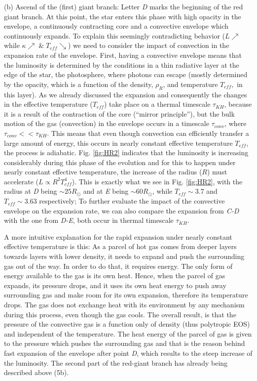 \documentclass{article}
\begin{document}
\begin{enumerate}
    (b) Ascend of the (first) giant branch: Letter {\it D} marks the beginning of the red giant branch. At this point, the star enters this phase with high opacity in the envelope, a continuously contracting core and a convective envelope which continuously expands. To explain this seemingly contradicting behavior ($L \nearrow$ while $\kappa \nearrow \; \&  \; T_{eff} \searrow$) we need to consider the impact of convection in the expansion rate of the envelope. First, having a convective envelope means that the luminosity is determined by the conditions in a thin radiative layer at the edge of the star, the photosphere, where photons can escape (mostly determined by the opacity, which is a function of the density, $\rho_R$, and temperature $T_{eff},$ in this layer).  As we already discussed the expansion and consequently the changes in the effective temperature ($T_{eff}$) take place on a thermal timescale $\tau_{KH}$, because it is a result of the contraction of the core (``mirror principle''), but the bulk motion of the gas (convection) in the envelope occurs in a timescale $\tau_{conv}$, where $\tau_{conv} << \tau_{KH}$. This means that even though convection can efficiently transfer a large amount of energy, this occurs in nearly constant effective temperature $T_{eff}$, the process is adiabatic. Fig. \ref{fig:HR2} indicates that the luminosity is increasing considerably during this phase of the evolution and for this to happen under nearly constant effective temperature, the increase of the radius ($R$) must accelerate ($L \propto R^2 T_{eff}^4$). This is exactly what we see in Fig. \ref{fig:HR2}, with the radius at {\it D} being $\sim 25 R_{\odot}$ and at {\it E} being $\sim 60 R_{\odot}$, while $T_{eff} \sim 3.7$ and $T_{eff} \sim 3.63$ respectively; To further evaluate the impact of the convective envelope on the expansion rate, we can also compare the expansion from {\it C-D} with the one from {\it D-E}, both occur in thermal timescale $\tau_{KH}$.

    A more intuitive explanation for the rapid expansion under nearly constant effective temperature is this: As a parcel of hot gas comes from deeper layers towards layers with lower density, it needs to expand and push the surrounding gas out of the way. In order to do that, it requires energy. The only form of energy available to the gas is its own heat. Hence, when the parcel of gas expands, its pressure drops, and it uses its own heat energy to push away surrounding gas and make room for its own expansion, therefore its temperature drops. The gas does not exchange heat with its environment by any mechanism during this process, even though the gas cools. The overall result, is that the pressure of the convective gas is a function only of density (thus polytropic EOS) and independent of the temperature. The heat energy of the parcel of gas is given to the pressure which pushes the surrounding gas and that is the reason behind fast expansion of the envelope after point {\it D}, which results to the steep increase of the luminosity. The second part of the red-giant branch has already being described above (5b).
    


\end{enumerate}
\end{document}
